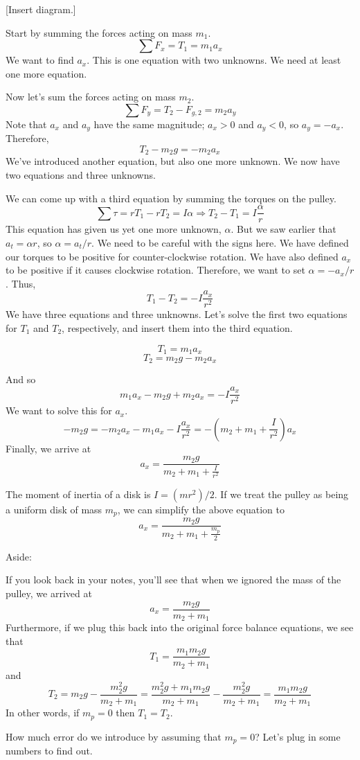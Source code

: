 [Insert diagram.]
\vspace{5cm}

Start by summing the forces acting on mass $m_1$.
$$\sum F_x=T_1=m_1a_x$$
We want to find $a_x$. 
This is one equation with two unknowns. We need at least one more equation.

Now let's sum the forces acting on mass $m_2$.
$$\sum F_y=T_2-F_{g,2}=m_2a_y$$
Note that $a_x$ and $a_y$ have the same magnitude; $a_x>0$ and $a_y<0$, so $a_y=-a_x$. Therefore,
$$T_2-m_2g=-m_2a_x$$
We've introduced another equation, but also one more unknown. We now have two equations and three unknowns.

We can come up with a third equation by summing the torques on the pulley.
$$\sum \tau=rT_1-rT_2=I\alpha\Rightarrow T_2-T_1=I\frac{\alpha}{r}$$
This equation has given us yet one more unknown, $\alpha$. But we saw earlier that $a_t=\alpha r$, so $\alpha=a_t/r$. We need to be careful with the signs here. We have defined our torques to be positive for counter-clockwise rotation. We have also defined $a_x$ to be positive if it causes clockwise rotation. Therefore, we want to set $\alpha=-a_x/r$. Thus,
$$T_1-T_2=-I\frac{a_x}{r^2}$$
We have three equations and three unknowns. Let's solve the first two equations for $T_1$ and $T_2$, respectively, and insert them into the third equation.

$$T_1=m_1a_x$$
$$T_2=m_2g-m_2a_x$$

And so
$$m_1a_x-m_2g+m_2a_x=-I\frac{a_x}{r^2}$$
We want to solve this for $a_x$.
$$-m_2g=-m_2a_x-m_1a_x-I\frac{a_x}{r^2}=-\left(m_2+m_1+\frac{I}{r^2}\right)a_x$$
Finally, we arrive at
$${a_x=\frac{m_2g}{m_2+m_1+\frac{I}{r^2}}}$$

The moment of inertia of a disk is $I=(mr^2)/2$. If we treat the pulley as being a uniform disk of mass $m_p$, we can simplify the above equation to 
$$\boxed{a_x=\frac{m_2g}{m_2+m_1+\frac{m_p}{2}}}$$

Aside:

If you look back in your notes, you'll see that when we ignored the mass of the pulley, we arrived at
$$a_x=\frac{m_2g}{m_2+m_1}$$
Furthermore, if we plug this back into the original force balance equations, we see that 
$$T_1=\frac{m_1m_2g}{m_2+m_1}$$
and
$$T_2=m_2g-\frac{m_2^2g}{m_2+m_1}=\frac{m_2^2g+m_1m_2g}{m_2+m_1}-\frac{m_2^2g}{m_2+m_1}=\frac{m_1m_2g}{m_2+m_1}$$
In other words, if $m_p=0$ then $T_1=T_2$.

How much error do we introduce by assuming that $m_p=0$? Let's plug in some numbers to find out.


